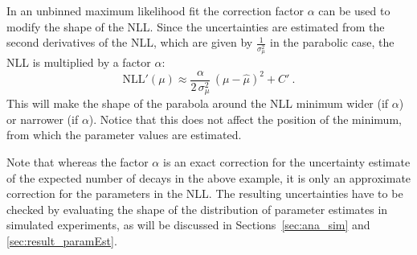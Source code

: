 In an unbinned maximum likelihood fit the correction factor $\alpha$ can be used to modify the shape of the NLL. Since the uncertainties
are estimated from the second derivatives of the NLL, which are given by $\frac{1}{\sigma_\mu^2}$ in the parabolic case, the NLL is
multiplied by a factor $\alpha$:
\begin{equation}
  \label{eq:NLLPara_alpha}
  \text{NLL}'(\mu) \approx \frac{\alpha}{2\,\sigma_\mu^2}\, (\mu-\hat{\mu})^2 + C' \ .
\end{equation}
This will make the shape of the parabola around the NLL minimum wider (if $\alpha$) or narrower (if $\alpha$). Notice that
this does not affect the position of the minimum, from which the parameter values are estimated.

Note that whereas the factor $\alpha$ is an exact correction for the uncertainty estimate of the expected number of decays in the above
example, it is only an approximate correction for the parameters in the NLL. The resulting uncertainties have to be checked by evaluating
the shape of the distribution of parameter estimates in simulated experiments, as will be discussed in Sections~\ref{sec:ana_sim} and
\ref{sec:result_paramEst}.
